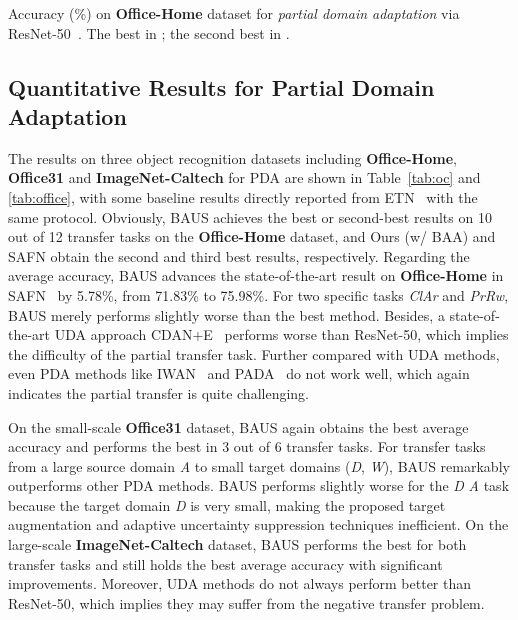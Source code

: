 \documentclass[runningheads]{llncs}
\begin{document}
	\setlength{\tabcolsep}{1.0pt}
	\begin{table*}[htbp]
		\centering
		\scriptsize
		\caption{Accuracy (\%) on \textbf{Office-Home} dataset for \emph{partial domain adaptation} via ResNet-50~\cite{he2016deep}. The best in \textbf{\color{red}{bold red}}; the second best in \textit{\color{blue}{italic blue}}.}
		\resizebox{1.0\textwidth}{!}{\to\to\to\to\to\to\to\to\to\to\to\to\pm\pm\pm\pm\pm\pm\pm\pm\pm\pm\pm\pm\pm\pm\pm\pm\pm\pm\pm\pm\pm\pm\pm\pm\pm\pm\pm\pm\pm\pm\pm\pm\pm\pm\pm\pm^3\pm\pm\pm\pm\pm\pm\pm\pm\pm\pm\pm\pm}
		\label{tab:oc}\end{table*}

\subsection{Quantitative Results for Partial Domain Adaptation}
The results on three object recognition datasets including \textbf{Office-Home}, \textbf{Office31} and \textbf{ImageNet-Caltech} for PDA are shown in Table~\ref{tab:oc} and \ref{tab:office}, with some baseline results directly reported from ETN~\cite{cao2019learning} with the same protocol.
Obviously, BAUS achieves the best or second-best results on 10 out of 12 transfer tasks on the \textbf{Office-Home} dataset, and Ours (w/ BAA) and SAFN obtain the second and third best results, respectively.
Regarding the average accuracy, BAUS advances the state-of-the-art result on \textbf{Office-Home} in SAFN~\cite{xu2019unsupervised} by 5.78\%, from 71.83\% to 75.98\%.
For two specific tasks \emph{Cl}\emph{Ar} and \emph{Pr}\emph{Rw}, BAUS merely performs slightly worse than the best method.
Besides, a state-of-the-art UDA approach CDAN+E~\cite{long2018conditional} performs worse than ResNet-50, which implies the difficulty of the partial transfer task.
Further compared with UDA methods, even PDA methods like IWAN~\cite{zhang2018importance} and PADA~\cite{cao2018partial} do not work well, which again indicates the partial transfer is quite challenging.


On the small-scale \textbf{Office31} dataset, BAUS again obtains the best average accuracy and performs the best in 3 out of 6 transfer tasks. 
For transfer tasks from a large source domain \emph{A} to small target domains (\emph{D}, \emph{W}), BAUS remarkably outperforms other PDA methods.
BAUS performs slightly worse for the \emph{D}  \emph{A} task because the target domain \emph{D} is very small, making the proposed target augmentation and adaptive uncertainty suppression techniques inefficient. 
On the large-scale \textbf{ImageNet-Caltech} dataset, BAUS performs the best for both transfer tasks and still holds the best average accuracy with significant improvements.
Moreover, UDA methods do not always perform better than ResNet-50, which implies they may suffer from the negative transfer problem. 
	
\end{document}
